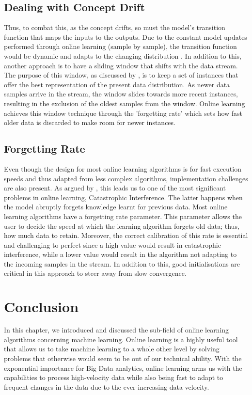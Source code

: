 \subsection{Dealing with Concept Drift}

Thus, to combat this, as the concept drifts, so must the model's transition function that maps the inputs to the outputs. Due to the constant model updates performed through online learning (sample by sample), the transition function would be dynamic and adapts to the changing distribution \citep{Gama2014ASO, hoi_online_2018, Lane:1998:AOL:3000292.3000339}. In addition to this, another approach is to have a sliding window that shifts with the data stream. The purpose of this window, as discussed by \citet{wozniak_hybrid_2011}, is to keep a set of instances that offer the best representation of the present data distribution. As newer data samples arrive in the stream, the window slides towards more recent instances, resulting in the exclusion of the oldest samples from the window. Online learning achieves this window technique through the 'forgetting rate' which sets how fast older data is discarded to make room for newer instances. 

\subsection{Forgetting Rate}

Even though the design for most online learning algorithms is for fast execution speeds and thus adapted from less complex algorithms, implementation challenges are also present. As argued by \citet{gepperth_incremental_2016}, this leads us to one of the most significant problems in online learning, Catastrophic Interference. The latter happens when the model abruptly forgets knowledge learnt for previous data. Most online learning algorithms have a forgetting rate parameter. This parameter allows the user to decide the speed at which the learning algorithm forgets old data; thus, how much data to retain. Moreover, the correct calibration of this rate is essential and challenging to perfect since a high value would result in catastrophic interference, while a lower value would result in the algorithm not adapting to the incoming samples in the stream. In addition to this, good initialisations are critical in this approach to steer away from slow convergence.

\section{Conclusion}

In this chapter, we introduced and discussed the sub-field of online learning algorithms concerning machine learning. Online learning is a highly useful tool that allows us to take machine learning to a whole other level by solving problems that otherwise would seem to be out of our technical ability. With the exponential importance for Big Data analytics, online learning arms us with the capabilities to process high-velocity data while also being fast to adapt to frequent changes in the data due to the ever-increasing data velocity.

